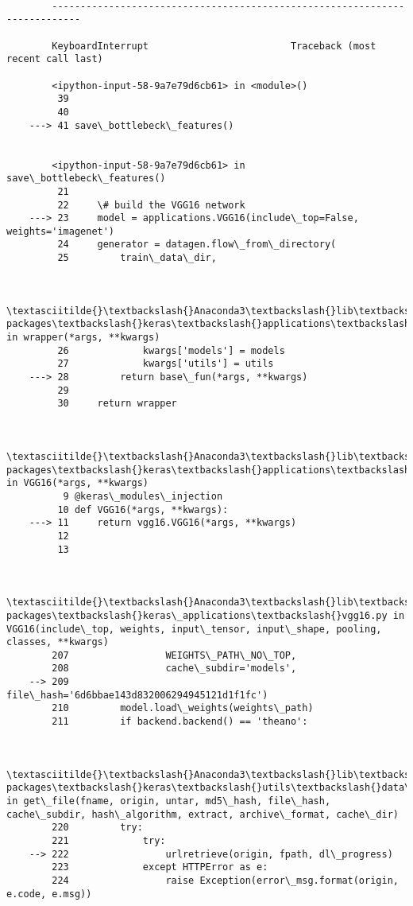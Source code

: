 \documentclass[11pt]{article}
\begin{document}
    \begin{Verbatim}[commandchars=\\\{\}]

        ---------------------------------------------------------------------------

        KeyboardInterrupt                         Traceback (most recent call last)

        <ipython-input-58-9a7e79d6cb61> in <module>()
         39 
         40 
    ---> 41 save\_bottlebeck\_features()
    

        <ipython-input-58-9a7e79d6cb61> in save\_bottlebeck\_features()
         21 
         22     \# build the VGG16 network
    ---> 23     model = applications.VGG16(include\_top=False, weights='imagenet')
         24     generator = datagen.flow\_from\_directory(
         25         train\_data\_dir,
    

        \textasciitilde{}\textbackslash{}Anaconda3\textbackslash{}lib\textbackslash{}site-packages\textbackslash{}keras\textbackslash{}applications\textbackslash{}\_\_init\_\_.py in wrapper(*args, **kwargs)
         26             kwargs['models'] = models
         27             kwargs['utils'] = utils
    ---> 28         return base\_fun(*args, **kwargs)
         29 
         30     return wrapper
    

        \textasciitilde{}\textbackslash{}Anaconda3\textbackslash{}lib\textbackslash{}site-packages\textbackslash{}keras\textbackslash{}applications\textbackslash{}vgg16.py in VGG16(*args, **kwargs)
          9 @keras\_modules\_injection
         10 def VGG16(*args, **kwargs):
    ---> 11     return vgg16.VGG16(*args, **kwargs)
         12 
         13 
    

        \textasciitilde{}\textbackslash{}Anaconda3\textbackslash{}lib\textbackslash{}site-packages\textbackslash{}keras\_applications\textbackslash{}vgg16.py in VGG16(include\_top, weights, input\_tensor, input\_shape, pooling, classes, **kwargs)
        207                 WEIGHTS\_PATH\_NO\_TOP,
        208                 cache\_subdir='models',
    --> 209                 file\_hash='6d6bbae143d832006294945121d1f1fc')
        210         model.load\_weights(weights\_path)
        211         if backend.backend() == 'theano':
    

        \textasciitilde{}\textbackslash{}Anaconda3\textbackslash{}lib\textbackslash{}site-packages\textbackslash{}keras\textbackslash{}utils\textbackslash{}data\_utils.py in get\_file(fname, origin, untar, md5\_hash, file\_hash, cache\_subdir, hash\_algorithm, extract, archive\_format, cache\_dir)
        220         try:
        221             try:
    --> 222                 urlretrieve(origin, fpath, dl\_progress)
        223             except HTTPError as e:
        224                 raise Exception(error\_msg.format(origin, e.code, e.msg))
    


\end{Verbatim}
\end{document}
